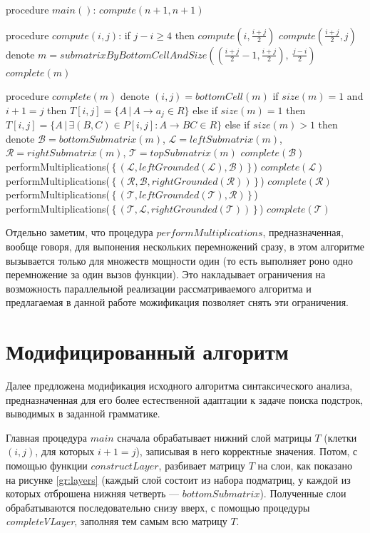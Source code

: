 \documentclass[a4paper,12pt]{article}  %
\theoremstyle{definition}
\theoremstyle{remark}
\begin{document}
\begin{algorithm}[caption={Алгоритм синтаксического анализа, основанный на перемножении матриц}, label={alg:okhotin}] 
procedure $main()$:
  $compute(n + 1, n + 1)$
    
procedure $compute(i, j)$:
  if $j-i \geqslant 4$ then
    $compute\left(i, \frac{i+j}{2}\right)$
    $compute\left(\frac{i+j}{2}, j\right)$
  denote $m = submatrixByBottomCellAndSize\left(\left(\frac{i+j}{2}-1,\frac{i+j}{2}\right),\ \frac{j-i}{2}\right)$
  $complete(m)$
    
procedure $complete(m)$
  denote $(i, j) = bottomCell(m)$
  if $size(m) = 1$ and $i + 1 = j$ then
    $T[i,j] = \{A\,|\,A\to a_j \in R\}$
  else if $size(m) = 1$ then
    $T[i,j] = \{A\,|\,\exists (B,C) \in P[i,j]: A \to BC \in R\}$
  else if $size(m) > 1$ then
    denote $\mathcal{B} = bottomSubmatrix(m)$, $\mathcal{L} = leftSubmatrix(m)$,
           $\mathcal{R} = rightSubmatrix(m)$, $\mathcal{T} = topSubmatrix(m)$
    $complete(\mathcal{B})$
    performMultiplications($\,\{\,(\mathcal{L}, leftGrounded(\mathcal{L}), \mathcal{B})\,\}\,$)
    $complete(\mathcal{L})$
    performMultiplications($\,\{\,(\mathcal{R}, \mathcal{B}, rightGrounded(\mathcal{R}))\,\}\,$)
    $complete(\mathcal{R})$
    performMultiplications($\,\{\,(\mathcal{T}, leftGrounded(\mathcal{T}), \mathcal{R})\,\}\,$)
    performMultiplications($\,\{\,(\mathcal{T}, \mathcal{L}, rightGrounded(\mathcal{T}))\,\}\,$)
    $complete(\mathcal{T})$
\end{algorithm}

Отдельно заметим, что процедура $performMultiplications$, предназначенная, вообще говоря, для выпонения нескольких перемножений сразу, в этом алгоритме вызывается только для множеств мощности один (то есть выполняет роно одно перемножение за один вызов функции). Это накладывает ограничения на возможность параллельной реализации рассматриваемого алгоритма и предлагаемая в данной работе можификация позволяет снять эти ограничения.

\section{Модифицированный алгоритм}
\label{se:modification}

Далее предложена модификация исходного алгоритма синтаксического анализа, предназначенная для его более естественной адаптации к задаче поиска подстрок, выводимых в заданной грамматике.

Главная процедура $main$ сначала обрабатывает нижний слой матрицы $T$ (клетки $(i,j)$, для которых $i+1=j$), записывая в него корректные значения. Потом, с помощью функции $constructLayer$, разбивает матрицу $T$ на слои, как показано на рисунке \ref{gr:layers} (каждый слой состоит из набора подматриц, у каждой из которых отброшена нижняя четверть --- $bottomSubmatrix$). Полученные слои обрабатываются последовательно снизу вверх, с помощью процедуры \textit{completeVLayer}, заполняя тем самым всю матрицу $T$.
\end{document}
